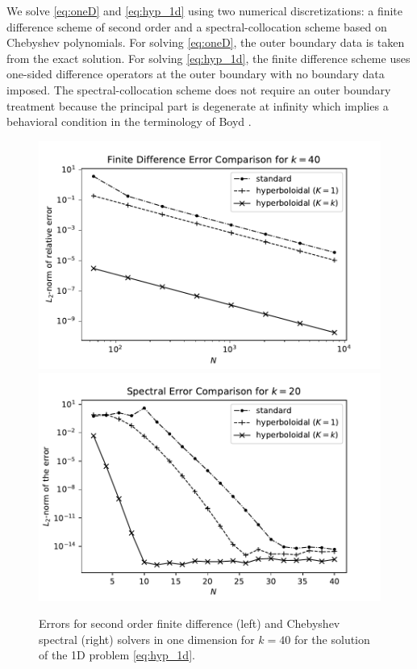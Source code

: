\documentclass[final,onefignum,onetabnum]{siamart190516}
\begin{document}
We solve \eqref{eq:oneD} and \eqref{eq:hyp_1d} using two numerical discretizations: a finite difference scheme of second order and a spectral-collocation scheme based on Chebyshev polynomials. For solving \eqref{eq:oneD}, the outer boundary data is taken from the exact solution. For solving \eqref{eq:hyp_1d}, the finite difference scheme uses one-sided difference operators at the outer boundary with no boundary data imposed. The spectral-collocation scheme does not require an outer boundary treatment because the principal part is degenerate at infinity which implies a behavioral condition in the terminology of Boyd \cite{boyd2001chebyshev}.

\begin{figure}[tbhp]
	\centering
	\includegraphics[scale=0.4]{figs/fd_err_1d}
	\includegraphics[scale=0.4]{figs/sp_err_1d}
	\caption{Errors for second order finite difference (left) and Chebyshev spectral (right) solvers in one dimension for $k=40$ for the solution of the 1D problem \eqref{eq:hyp_1d}.}
	\label{fig:errs_oned}
\end{figure}
\end{document}
